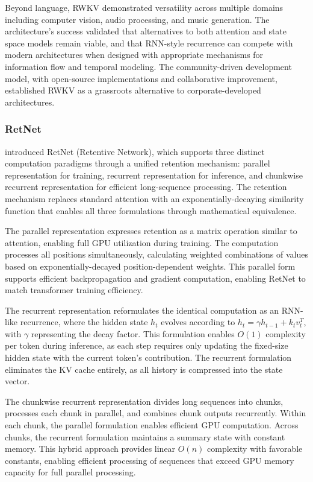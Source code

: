 Beyond language, RWKV demonstrated versatility across multiple domains including computer vision, audio processing, and music generation. The architecture's success validated that alternatives to both attention and state space models remain viable, and that RNN-style recurrence can compete with modern architectures when designed with appropriate mechanisms for information flow and temporal modeling. The community-driven development model, with open-source implementations and collaborative improvement, established RWKV as a grassroots alternative to corporate-developed architectures.

\subsubsection{RetNet}

\citet{sun2023retentive} introduced RetNet (Retentive Network), which supports three distinct computation paradigms through a unified retention mechanism: parallel representation for training, recurrent representation for inference, and chunkwise recurrent representation for efficient long-sequence processing. The retention mechanism replaces standard attention with an exponentially-decaying similarity function that enables all three formulations through mathematical equivalence.

The parallel representation expresses retention as a matrix operation similar to attention, enabling full GPU utilization during training. The computation processes all positions simultaneously, calculating weighted combinations of values based on exponentially-decayed position-dependent weights. This parallel form supports efficient backpropagation and gradient computation, enabling RetNet to match transformer training efficiency.

The recurrent representation reformulates the identical computation as an RNN-like recurrence, where the hidden state $h_t$ evolves according to $h_t = \gamma h_{t-1} + k_t v_t^T$, with $\gamma$ representing the decay factor. This formulation enables $O(1)$ complexity per token during inference, as each step requires only updating the fixed-size hidden state with the current token's contribution. The recurrent formulation eliminates the KV cache entirely, as all history is compressed into the state vector.

The chunkwise recurrent representation divides long sequences into chunks, processes each chunk in parallel, and combines chunk outputs recurrently. Within each chunk, the parallel formulation enables efficient GPU computation. Across chunks, the recurrent formulation maintains a summary state with constant memory. This hybrid approach provides linear $O(n)$ complexity with favorable constants, enabling efficient processing of sequences that exceed GPU memory capacity for full parallel processing.

